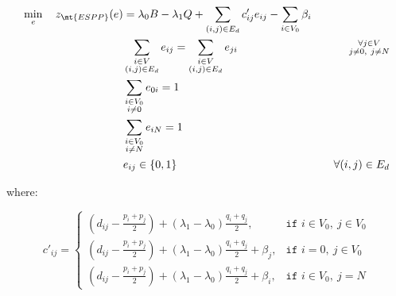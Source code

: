 \begin{align}
	\min_{e} \quad z_\mt{ESPP}(e) & = \lambda_0 B - \lambda_1 Q + \sum_{(i, j) \in E_d}  c'_{ij} e_{ij} - \sum_{i \in V_0} \beta_i  \label{eq:esp-relaxed-obj-function}                                                                                      \\
	                              & \sum_{\substack{i \in V                                                                                                                                                                                                  \\ (i, j) \in E_d}}       e_{ij}  = \sum_{\substack{i \in V \\ (i, j) \in E_d}} e_{ji}                                                       & \quad \substack{\forall j \in V                                             \\ j \ne 0,\ j \ne N}         \label{eq:esp-relaxed-flow-conservation-constraint-customers} \\
	                              & \sum_{\substack{i \in V_0                                                                                                                                                                                                \\ i \ne 0}} e_{0i} = 1 & \label{eq:espprc-flow-conservation-constraint-depot1} \\
	                              & \sum_{\substack{i \in V_0                                                                                                                                                                                                \\ i \ne N}} e_{iN} = 1 & \label{eq:esp-relaxed-flow-conservation-constraint-depot2} \\
	                              & e_{ij}                   \in \lbrace 0, 1 \rbrace                                                                                   & \quad \forall (i, j) \in E_d               \label{eq:esp-relaxed-e-mip-var-bounds} \\
\end{align}

where:

\begin{equation}
	c'_{ij} =
	\begin{cases}
		\left( d_{ij} - \frac{p_i + p_j}{2} \right) + \left(\lambda_1 - \lambda_0 \right)  \frac{q_i + q_j}{2},           & \texttt{if } i \in V_0,\ j \in V_0 \\
		\left( d_{ij} - \frac{p_i + p_j}{2} \right) + \left(\lambda_1 - \lambda_0 \right)  \frac{q_i + q_j}{2} + \beta_j, & \texttt{if } i = 0,\ j \in V_0     \\
		\left( d_{ij} - \frac{p_i + p_j}{2} \right) + \left(\lambda_1 - \lambda_0 \right)  \frac{q_i + q_j}{2} + \beta_i, & \texttt{if } i \in V_0,\ j = N
	\end{cases}
\end{equation}

